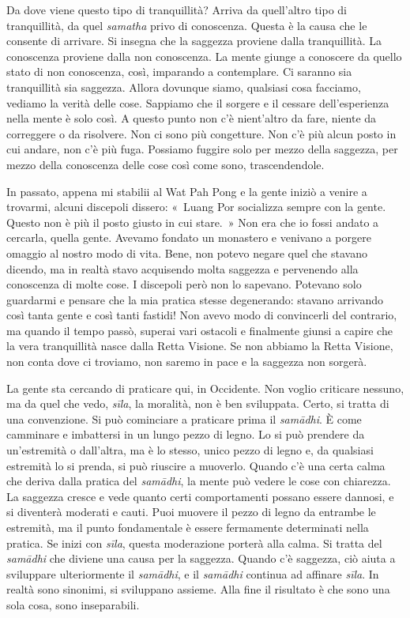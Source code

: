 Da dove viene questo tipo di tranquillità? Arriva da quell'altro tipo di
tranquillità, da quel \emph{samatha} privo di conoscenza. Questa è la
causa che le consente di arrivare. Si insegna che la saggezza proviene
dalla tranquillità. La conoscenza proviene dalla non conoscenza. La
mente giunge a conoscere da quello stato di non conoscenza, così,
imparando a contemplare. Ci saranno sia tranquillità sia saggezza.
Allora dovunque siamo, qualsiasi cosa facciamo, vediamo la verità delle
cose. Sappiamo che il sorgere e il cessare dell'esperienza nella mente è
solo così. A questo punto non c'è nient'altro da fare, niente da
correggere o da risolvere. Non ci sono più congetture. Non c'è più alcun
posto in cui andare, non c'è più fuga. Possiamo fuggire solo per mezzo
della saggezza, per mezzo della conoscenza delle cose così come sono,
trascendendole.

In passato, appena mi stabilii al Wat Pah Pong e la gente iniziò a
venire a trovarmi, alcuni discepoli dissero: «~Luang Por socializza
sempre con la gente. Questo non è più il posto giusto in cui stare.~»
Non era che io fossi andato a cercarla, quella gente. Avevamo fondato un
monastero e venivano a porgere omaggio al nostro modo di vita. Bene, non
potevo negare quel che stavano dicendo, ma in realtà stavo acquisendo
molta saggezza e pervenendo alla conoscenza di molte cose. I discepoli
però non lo sapevano. Potevano solo guardarmi e pensare che la mia
pratica stesse degenerando: stavano arrivando così tanta gente e così
tanti fastidi! Non avevo modo di convincerli del contrario, ma quando il
tempo passò, superai vari ostacoli e finalmente giunsi a capire che la
vera tranquillità nasce dalla Retta Visione. Se non abbiamo la Retta
Visione, non conta dove ci troviamo, non saremo in pace e la saggezza
non sorgerà.

La gente sta cercando di praticare qui, in Occidente. Non voglio
criticare nessuno, ma da quel che vedo, \emph{sīla}, la moralità, non è
ben sviluppata. Certo, si tratta di una convenzione. Si può cominciare a
praticare prima il \emph{samādhi}. È come camminare e imbattersi in un
lungo pezzo di legno. Lo si può prendere da un'estremità o dall'altra,
ma è lo stesso, unico pezzo di legno e, da qualsiasi estremità lo si
prenda, si può riuscire a muoverlo. Quando c'è una certa calma che
deriva dalla pratica del \emph{samādhi}, la mente può vedere le cose con
chiarezza. La saggezza cresce e vede quanto certi comportamenti possano
essere dannosi, e si diventerà moderati e cauti. Puoi muovere il pezzo
di legno da entrambe le estremità, ma il punto fondamentale è essere
fermamente determinati nella pratica. Se inizi con \emph{sīla}, questa
moderazione porterà alla calma. Si tratta del \emph{samādhi} che diviene
una causa per la saggezza. Quando c'è saggezza, ciò aiuta a sviluppare
ulteriormente il \emph{samādhi}, e il \emph{samādhi} continua ad
affinare \emph{sīla}. In realtà sono sinonimi, si sviluppano assieme.
Alla fine il risultato è che sono una sola cosa, sono inseparabili.

